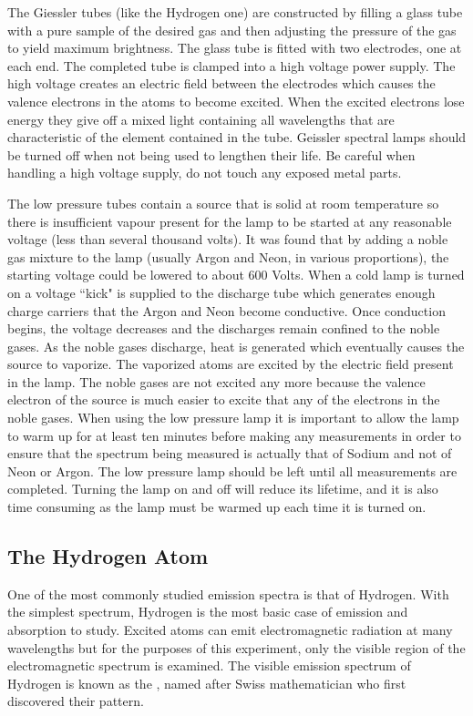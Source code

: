 \documentclass[12pt, a4paper, oneside, openright, titlepage]{book}
\begin{document}
\noindent The Giessler tubes (like the Hydrogen one) are constructed by filling a glass tube with a pure sample of the desired gas and then adjusting the pressure of the gas to yield maximum brightness. The glass tube is fitted with two electrodes, one at each end. The completed tube is clamped into a high voltage power supply. The high voltage creates an electric field between the electrodes which causes the valence electrons in the atoms to become excited. When the excited electrons lose energy they give off a mixed light containing all wavelengths that are characteristic of the element contained in the tube. Geissler spectral lamps should be turned off when not being used to lengthen their life. Be careful when handling a high voltage supply, do not touch any exposed metal parts.

\noindent The low pressure tubes contain a source that is solid at room temperature so there is insufficient vapour present for the lamp to be started at any reasonable voltage (less than several thousand volts). It was found that by adding a noble gas mixture to the lamp (usually Argon and Neon, in various proportions), the starting voltage could be lowered to about $600$ Volts. When a cold lamp is turned on a voltage ``kick" is supplied to the discharge tube which generates enough charge carriers that the Argon and Neon become conductive. Once conduction begins, the voltage decreases and the discharges remain confined to the noble gases. As the noble gases discharge, heat is generated which eventually causes the source to vaporize. The vaporized atoms are excited by the electric field present in the lamp. The noble gases are not excited any more because the valence electron of the source is much easier to excite that any of the electrons in the noble gases. When using the low pressure lamp it is important to allow the lamp to warm up for at least ten minutes before making any measurements in order to ensure that the spectrum being measured is actually that of Sodium and not of Neon or Argon. The low pressure lamp should be left until all measurements are completed. Turning the lamp on and off will reduce its lifetime, and it is also time consuming as the lamp must be warmed up each time it is turned on.

\subsection{The Hydrogen Atom}

One of the most commonly studied emission spectra is that of Hydrogen. With the simplest spectrum, Hydrogen is the most basic case of emission and absorption to study. Excited atoms can emit electromagnetic radiation at many wavelengths but for the purposes of this experiment, only the visible region of the electromagnetic spectrum is examined. The visible emission spectrum of Hydrogen is known as the , named after Swiss mathematician who first discovered their pattern.
\end{document}
